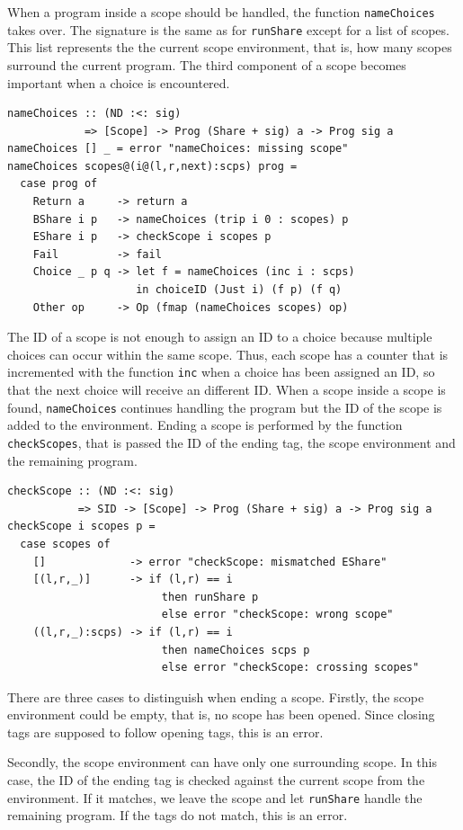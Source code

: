 \documentclass[a4paper, 11pt, fleqn, twoside]{scrreprt}
\newcommand{\hinl}[1]{\texttt{#1}}
\begin{document}
When a program inside a scope should be handled, the function \hinl{nameChoices} takes over.
The signature is the same as for \hinl{runShare} except for a list of scopes.
This list represents the the current scope environment, that is, how many scopes surround the current program.
The third component of a scope becomes important when a choice is encountered.

\begin{verbatim}
nameChoices :: (ND :<: sig)
            => [Scope] -> Prog (Share + sig) a -> Prog sig a
nameChoices [] _ = error "nameChoices: missing scope"
nameChoices scopes@(i@(l,r,next):scps) prog =
  case prog of
    Return a     -> return a
    BShare i p   -> nameChoices (trip i 0 : scopes) p
    EShare i p   -> checkScope i scopes p
    Fail         -> fail
    Choice _ p q -> let f = nameChoices (inc i : scps)
                    in choiceID (Just i) (f p) (f q)
    Other op     -> Op (fmap (nameChoices scopes) op)
\end{verbatim}

The ID of a scope is not enough to assign an ID to a choice because multiple choices can occur within the same scope.
Thus, each scope has a counter that is incremented with the function \hinl{inc} when a choice has been assigned an ID, so that the next choice will receive an different ID.
When a scope inside a scope is found, \hinl{nameChoices} continues handling the program but the ID of the scope is added to the environment.
Ending a scope is performed by the function \hinl{checkScopes}, that is passed the ID of the ending tag, the scope environment and the remaining program.

\begin{verbatim}
checkScope :: (ND :<: sig)
           => SID -> [Scope] -> Prog (Share + sig) a -> Prog sig a
checkScope i scopes p =
  case scopes of
    []             -> error "checkScope: mismatched EShare"
    [(l,r,_)]      -> if (l,r) == i
                        then runShare p
                        else error "checkScope: wrong scope"
    ((l,r,_):scps) -> if (l,r) == i
                        then nameChoices scps p
                        else error "checkScope: crossing scopes"
\end{verbatim}

There are three cases to distinguish when ending a scope.
Firstly, the scope environment could be empty, that is, no scope has been opened.
Since closing tags are supposed to follow opening tags, this is an error.

Secondly, the scope environment can have only one surrounding scope.
In this case, the ID of the ending tag is checked against the current scope from the environment.
If it matches, we leave the scope and let \hinl{runShare} handle the remaining program.
If the tags do not match, this is an error.
\end{document}
